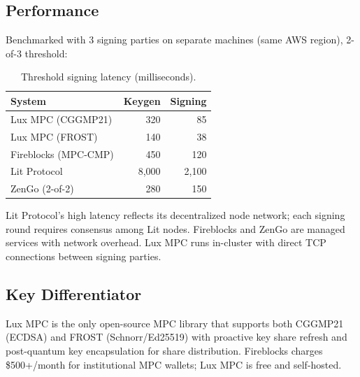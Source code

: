 \subsection{Performance}

Benchmarked with 3 signing parties on separate machines (same AWS region), 2-of-3 threshold:

\begin{table}[H]
\centering
\caption{Threshold signing latency (milliseconds).}
\footnotesize
\begin{tabular}{@{}lrr@{}}
\toprule
System & Keygen & Signing \\
\midrule
Lux MPC (CGGMP21) & 320 & 85 \\
Lux MPC (FROST) & 140 & 38 \\
Fireblocks (MPC-CMP) & 450 & 120 \\
Lit Protocol & 8,000 & 2,100 \\
ZenGo (2-of-2) & 280 & 150 \\
\bottomrule
\end{tabular}
\end{table}

Lit Protocol's high latency reflects its decentralized node network; each signing round requires consensus among Lit nodes. Fireblocks and ZenGo are managed services with network overhead. Lux MPC runs in-cluster with direct TCP connections between signing parties.

\subsection{Key Differentiator}

Lux MPC is the only open-source MPC library that supports both CGGMP21 (ECDSA) and FROST (Schnorr/Ed25519) with proactive key share refresh and post-quantum key encapsulation for share distribution. Fireblocks charges \$500+/month for institutional MPC wallets; Lux MPC is free and self-hosted.

